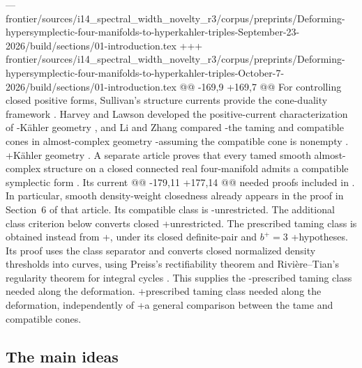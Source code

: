 --- frontier/sources/i14_spectral_width_novelty_r3/corpus/preprints/Deforming-hypersymplectic-four-manifolds-to-hyperkahler-triples-September-23-2026/build/sections/01-introduction.tex
+++ frontier/sources/i14_spectral_width_novelty_r3/corpus/preprints/Deforming-hypersymplectic-four-manifolds-to-hyperkahler-triples-October-7-2026/build/sections/01-introduction.tex
@@ -169,9 +169,7 @@
 For controlling closed positive forms, Sullivan's structure currents
 provide the cone-duality framework \cite{Sullivan1976}.
 Harvey and Lawson developed the positive-current characterization of
-K\"ahler geometry \cite{HarveyLawson1983}, and Li and Zhang compared
-the taming and compatible cones in almost-complex geometry
-assuming the compatible cone is nonempty \cite{LiZhang2009}.
+K\"ahler geometry \cite{HarveyLawson1983}.
 A separate article proves that every tamed smooth
 almost-complex structure on a closed connected real four-manifold admits a compatible
 symplectic form \cite[Theorem~1.1]{OpenAITaming2026}. Its current
@@ -179,11 +177,14 @@
 needed proofs included in .
 In particular, smooth density-weight closedness already appears in
 the proof in Section~6 of that article. Its compatible class is
-unrestricted. The additional class criterion below converts closed
+unrestricted. The prescribed taming class is obtained instead from
+, under its closed definite-pair and $b^+=3$
+hypotheses. Its proof uses the class separator and converts closed
 normalized density thresholds into curves, using Preiss's
 rectifiability theorem and Rivi\`ere--Tian's regularity theorem for
 integral cycles \cite{Preiss1987,RiviereTian2009}. This supplies the
-prescribed taming class needed along the deformation.
+prescribed taming class needed along the deformation, independently of
+a general comparison between the tame and compatible cones.
 
 \subsection{The main ideas}
 
